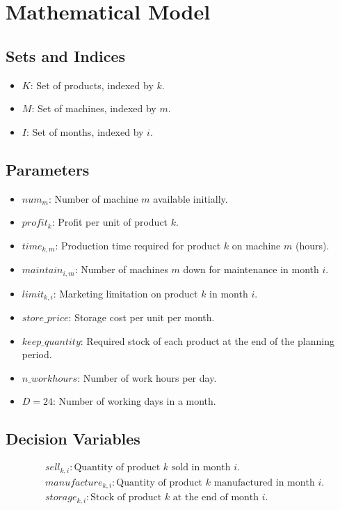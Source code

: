 \documentclass{article}
\begin{document}
\section*{Mathematical Model}

\subsection*{Sets and Indices}
\begin{itemize}
    \item $K$: Set of products, indexed by $k$.
    \item $M$: Set of machines, indexed by $m$.
    \item $I$: Set of months, indexed by $i$.
\end{itemize}

\subsection*{Parameters}
\begin{itemize}
    \item $num_{m}$: Number of machine $m$ available initially.
    \item $profit_k$: Profit per unit of product $k$.
    \item $time_{k, m}$: Production time required for product $k$ on machine $m$ (hours).
    \item $maintain_{i, m}$: Number of machines $m$ down for maintenance in month $i$.
    \item $limit_{k, i}$: Marketing limitation on product $k$ in month $i$.
    \item $store\_price$: Storage cost per unit per month.
    \item $keep\_quantity$: Required stock of each product at the end of the planning period.
    \item $n\_workhours$: Number of work hours per day.
    \item $D = 24$: Number of working days in a month.
\end{itemize}

\subsection*{Decision Variables}
\begin{align*}
    & sell_{k, i}: \text{Quantity of product } k \text{ sold in month } i. \\
    & manufacture_{k, i}: \text{Quantity of product } k \text{ manufactured in month } i. \\
    & storage_{k, i}: \text{Stock of product } k \text{ at the end of month } i.
\end{align*}
\end{document}

